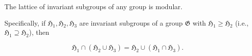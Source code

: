 The lattice of invariant subgroups of any group is modular.

Specifically, if $\mathfrak{H}_1, \mathfrak{H}_2, \mathfrak{H}_3$ are invariant subgroups of a group $\mathfrak{G}$ with $\mathfrak{H}_1 \geq \mathfrak{H}_2$ (i.e., $\mathfrak{H}_1 \supseteq \mathfrak{H}_2$), then

$$\mathfrak{H}_1 \cap (\mathfrak{H}_2 \cup \mathfrak{H}_3) = \mathfrak{H}_2 \cup (\mathfrak{H}_1 \cap \mathfrak{H}_3).$$
